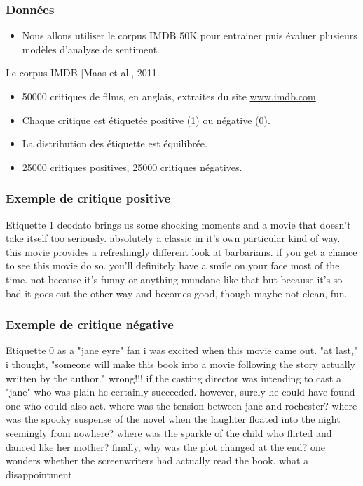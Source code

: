 \documentclass{beamer}
\begin{document}
\begin{frame}
  \frametitle{Donn\'ees}

  \begin{itemize}
  \item Nous allons utiliser le corpus IMDB 50K pour entrainer puis \'evaluer plusieurs mod\`eles d'analyse de sentiment. 
  \end{itemize}

  \begin{block}{Le corpus IMDB [Maas et al., 2011]}
    \begin{itemize}
    \item 50000 critiques de films, en anglais, extraites du site \url{www.imdb.com}.
    \item Chaque critique est \'etiquet\'ee positive (1) ou n\'egative (0).
    \item La distribution des \'etiquette est \'equilibr\'ee.
    \item 25000 critiques positives, 25000 critiques n\'egatives.
    \end{itemize}
  \end{block}
\end{frame}


\begin{frame}
  \frametitle{Exemple de critique positive}

  \begin{exampleblock}{Etiquette 1}
    deodato brings us some shocking moments and a movie that doesn't take itself too seriously. absolutely a classic in it's own particular kind of way. this movie provides a refreshingly different look at barbarians. if you get a chance to see this movie do so. you'll definitely have a smile on your face most of the time. not because it's funny or anything mundane like that but because it's so bad it goes out the other way and becomes good, though maybe not clean, fun.
  \end{exampleblock}

\end{frame}



\begin{frame}
  \frametitle{Exemple de critique n\'egative}

  \begin{alertblock}{Etiquette 0}
    as a "jane eyre" fan i was excited when this movie came out. "at last," i thought, "someone will make this book into a movie following the story actually written by the author." wrong!!! if the casting director was intending to cast a "jane" who was plain he certainly succeeded. however, surely he could have found one who could also act. where was the tension between jane and rochester? where was the spooky suspense of the novel when the laughter floated into the night seemingly from nowhere? where was the sparkle of the child who flirted and danced like her mother? finally, why was the plot changed at the end? one wonders whether the screenwriters had actually read the book. what a disappointment
  \end{alertblock}

\end{frame}
\end{document}
